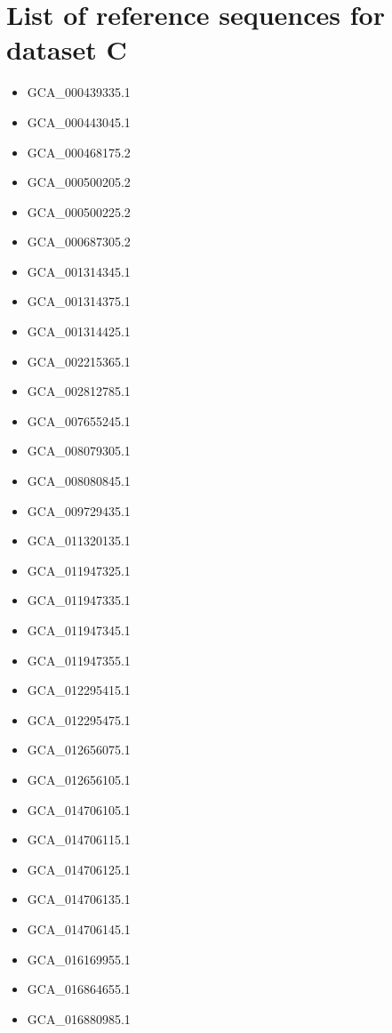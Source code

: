 
\section{List of reference sequences for dataset C}
\begin{itemize}
    \item GCA\_000439335.1
    \item GCA\_000443045.1
    \item GCA\_000468175.2
    \item GCA\_000500205.2
    \item GCA\_000500225.2
    \item GCA\_000687305.2
    \item GCA\_001314345.1
    \item GCA\_001314375.1
    \item GCA\_001314425.1
    \item GCA\_002215365.1
    \item GCA\_002812785.1
    \item GCA\_007655245.1
    \item GCA\_008079305.1
    \item GCA\_008080845.1
    \item GCA\_009729435.1
    \item GCA\_011320135.1
    \item GCA\_011947325.1
    \item GCA\_011947335.1
    \item GCA\_011947345.1
    \item GCA\_011947355.1
    \item GCA\_012295415.1
    \item GCA\_012295475.1
    \item GCA\_012656075.1
    \item GCA\_012656105.1
    \item GCA\_014706105.1
    \item GCA\_014706115.1
    \item GCA\_014706125.1
    \item GCA\_014706135.1
    \item GCA\_014706145.1
    \item GCA\_016169955.1
    \item GCA\_016864655.1
    \item GCA\_016880985.1

\end{itemize}
